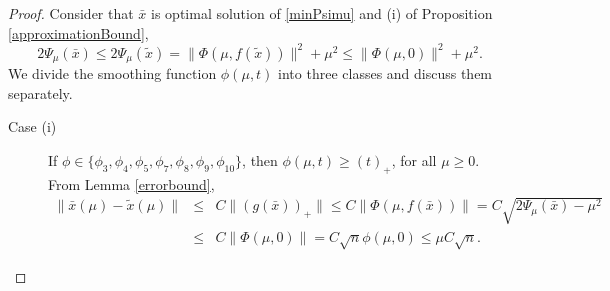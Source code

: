 \documentclass[12pt]{article}
\begin{document}
\begin{proof}
Consider that $\bar{x}$ is optimal solution of \eqref{minPsimu}
and (i) of Proposition \eqref{approximationBound},
 \begin{equation}\label{maxPsimu}
    2\Psi_\mu(\bar{x}) \leq 2\Psi_\mu(\tilde{x}) = \| \Phi(\mu, f(\tilde{x}))\|^2 
    +\mu^2 \leq  \|\Phi(\mu, 0)\|^2 + \mu^2.
\end{equation}
 We divide the smoothing function $\phi(\mu,t)$ into three classes and 
discuss them separately.
\begin{description}
    \item[Case (i)] If $\phi \in \{\phi_3, \phi_4, \phi_5, \phi_7, 
                    \phi_8, \phi_9, \phi_{10}\}$, then $\phi(\mu,t) \geq (t)_+$, for all $\mu \geq 0$.
                    From Lemma \ref{errorbound}, 
                \begin{eqnarray*}
                     \| \bar{x}(\mu) - \tilde{x}(\mu)\| &\leq& C\|(g( \bar{x}))_+\| \leq  
                      C\|\Phi(\mu,f( \bar{x}))\| = C\sqrt{2\Psi_\mu(\bar{x})-\mu^2}\\
                         &\leq&   C\|\Phi(\mu, 0)\| =C\sqrt{n}\phi(\mu,0) \leq \mu C\sqrt{n}.
                \end{eqnarray*}


\end{description}
\end{proof}
\end{document}
